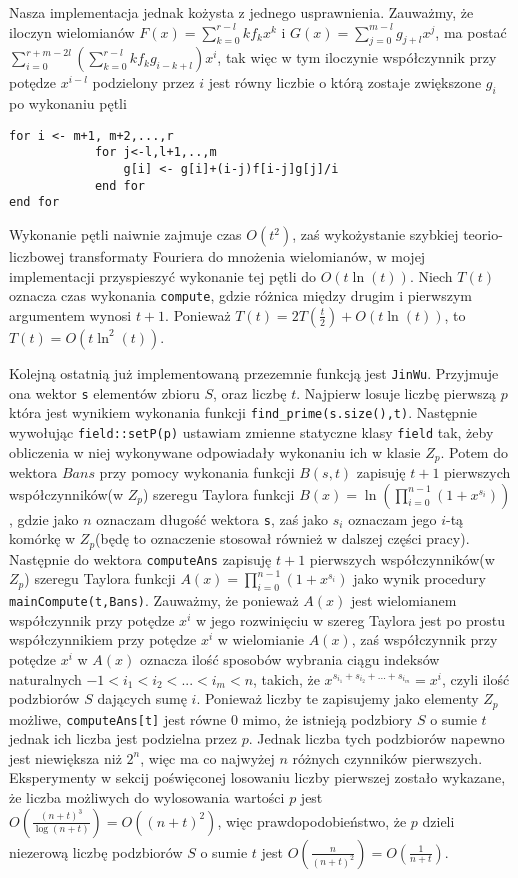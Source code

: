 \documentclass{article}
\begin{document}
Nasza implementacja jednak kożysta z jednego usprawnienia. Zauważmy, że iloczyn wielomianów $F(x)=\sum_{k=0}^{r-l}kf_kx^k$ i 
$G(x)=\sum_{j=0}^{m-l}g_{j+l}x^j$, ma postać 
$\sum_{i=0}^{r+m-2l}(\sum_{k=0}^{r-l}kf_kg_{i-k+l})x^i$, tak więc w tym iloczynie współczynnik przy potędze $x^{i-l}$ podzielony
przez $i$ jest równy liczbie o którą zostaje zwiększone $g_i$ po wykonaniu pętli
\begin{lstlisting}
for i <- m+1, m+2,...,r
            for j<-l,l+1,..,m
                g[i] <- g[i]+(i-j)f[i-j]g[j]/i
            end for
end for
\end{lstlisting}

Wykonanie pętli naiwnie zajmuje czas $O(t^2)$, zaś wykożystanie szybkiej teorio-liczbowej transformaty Fouriera do mnożenia wielomianów,
w mojej implementacji przyspieszyć wykonanie tej pętli do $O(t\ln(t))$.
Niech $T(t)$ oznacza czas wykonania \texttt{compute}, gdzie różnica między drugim i pierwszym argumentem wynosi $t+1$.
Ponieważ $T(t)=2T(\frac{t}{2})+O(t\ln(t))$, to $T(t)=O(t \ln^2(t))$.

Kolejną ostatnią już implementowaną przezemnie funkcją jest \texttt{JinWu}. Przyjmuje ona wektor \texttt{s} elementów zbioru 
$S$, oraz
liczbę $t$. Najpierw losuje liczbę pierwszą $p$ która jest wynikiem wykonania funkcji \texttt{find\_prime(s.size(),t)}. Następnie
wywołując \texttt{field::setP(p)} ustawiam zmienne statyczne klasy \texttt{field} tak, żeby obliczenia w niej wykonywane 
odpowiadały wykonaniu ich w klasie $Z_p$. Potem do wektora $Bans$ przy pomocy wykonania funkcji $B(s,t)$ zapisuję
$t+1$ pierwszych współczynników(w $Z_p$) szeregu Taylora funkcji $B(x)=\ln(\prod_{i=0}^{n-1}(1+x^{s_i}))$, gdzie jako $n$ oznaczam długość
wektora \texttt{s}, zaś jako $s_i$ oznaczam jego $i$-tą komórkę w $Z_p$(będę to oznaczenie stosował również w dalszej części pracy). 
Następnie do wektora \texttt{computeAns} zapisuję $t+1$ pierwszych współczynników(w $Z_p$) szeregu Taylora funkcji 
$A(x)=\prod_{i=0}^{n-1}(1+x^{s_i})$ jako wynik procedury \texttt{mainCompute(t,Bans)}. 
Zauważmy, że ponieważ $A(x)$ jest wielomianem współczynnik
przy potędze $x^i$ w jego rozwinięciu w szereg Taylora jest po prostu współczynnikiem przy potędze $x^i$ w wielomianie $A(x)$, zaś współczynnik przy potędze $x^i$ w $A(x)$ oznacza ilość sposobów wybrania ciągu indeksów naturalnych $-1<i_1<i_2<...<i_m<n$, 
takich, że
$x^{s_{i_1}+s_{i_2}+...+s_{i_m}}=x^i$, czyli ilość podzbiorów $S$ dających sumę $i$. Ponieważ liczby te zapisujemy jako elementy 
$Z_p$ możliwe, \texttt{computeAns[t]} jest równe $0$ mimo, że istnieją podzbiory $S$ o sumie $t$ jednak ich liczba jest podzielna
przez $p$. Jednak liczba tych podzbiorów napewno jest niewiększa niż $2^n$, więc ma co najwyżej $n$ różnych czynników pierwszych.
Eksperymenty w sekcij poświęconej losowaniu liczby pierwszej zostało wykazane, że liczba możliwych do wylosowania wartości $p$
jest $O(\frac{(n+t)^3}{\log(n+t)})=O((n+t)^2)$, więc prawdopodobieństwo, że $p$ dzieli niezerową liczbę podzbiorów $S$ o sumie $t$
jest $O(\frac{n}{(n+t)^2})=O(\frac{1}{n+t})$.
\end{document}
